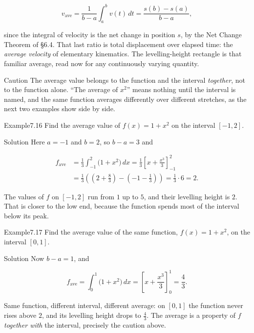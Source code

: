 \documentclass[a4paper,12pt,oneside]{memoir}
\begin{document}
\[ v_{\text{ave}} = \frac{1}{b - a}\int_{a}^{b} v(t)\,dt = \frac{s(b) - s(a)}{b - a}, \]

since the integral of velocity is the net change in position \(s\), by the Net Change Theorem of §6.4. That last ratio is total displacement over elapsed time: the \emph{average velocity} of elementary kinematics. The levelling-height rectangle is that familiar average, read now for any continuously varying quantity.

\begin{envcaution}{Caution}{}{}
The average value belongs to the function and the interval \emph{together}, not to the function alone. “The average of \(x^{2}\)” means nothing until the interval is named, and the same function averages differently over different stretches, as the next two examples show side by side.
\end{envcaution}
\begin{workedexample}
\begin{envexample}{Example}{7.16}{}
Find the average value of \(f(x) = 1 + x^{2}\) on the interval \([-1, 2]\).
\end{envexample}
\begin{envsolution}{Solution}{}{}
Here \(a = -1\) and \(b = 2\), so \(b - a = 3\) and

\[ \begin{aligned}
          f_{\text{ave}} &= \frac{1}{3} \int_{-1}^{2} \bigl(1 + x^{2}\bigr)\,dx = \frac{1}{3}\left[x + \frac{x^{3}}{3}\right]_{-1}^{2} \\[2pt]
            &= \frac{1}{3}\left(\left(2 + \frac{8}{3}\right) - \left(-1 - \frac{1}{3}\right)\right) = \frac{1}{3}\cdot 6 = 2.
        \end{aligned} \]

The values of \(f\) on \([-1, 2]\) run from \(1\) up to \(5\), and their levelling height is \(2\). That is closer to the low end, because the function spends most of the interval below its peak. \qedmark
\end{envsolution}
\end{workedexample}
\begin{workedexample}
\begin{envexample}{Example}{7.17}{}
Find the average value of the same function, \(f(x) = 1 + x^{2}\), on the interval \([0, 1]\).
\end{envexample}
\begin{envsolution}{Solution}{}{}
Now \(b - a = 1\), and

\[ f_{\text{ave}} = \int_{0}^{1} \bigl(1 + x^{2}\bigr)\,dx = \left[x + \frac{x^{3}}{3}\right]_{0}^{1} = \frac{4}{3}. \]

Same function, different interval, different average: on \([0, 1]\) the function never rises above \(2\), and its levelling height drops to \(\tfrac{4}{3}\). The average is a property of \(f\) \emph{together with} the interval, precisely the caution above. \qedmark
\end{envsolution}
\end{workedexample}
\end{document}
